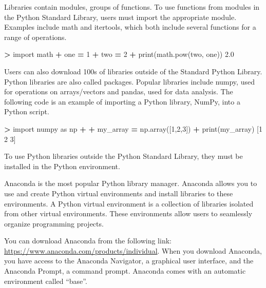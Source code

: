 \documentclass[
]{book}
\newenvironment{Shaded}{\begin{snugshade}}{\end{snugshade}}
\newcommand{\BuiltInTok}[1]{#1}
\newcommand{\DecValTok}[1]{\textcolor[rgb]{0.00,0.00,0.81}{#1}}
\newcommand{\FloatTok}[1]{\textcolor[rgb]{0.00,0.00,0.81}{#1}}
\newcommand{\ImportTok}[1]{#1}
\newcommand{\NormalTok}[1]{#1}
\newcommand{\OperatorTok}[1]{\textcolor[rgb]{0.81,0.36,0.00}{\textbf{#1}}}
\begin{document}
Libraries contain modules, groups of functions. To use functions from modules in the Python Standard Library, users must import the appropriate module. Examples include math and itertools, which both include several functions for a range of operations.

\begin{Shaded}
\begin{Highlighting}[]
\OperatorTok{\textgreater{}} \ImportTok{import}\NormalTok{ math}
\OperatorTok{+}\NormalTok{ one }\OperatorTok{=} \DecValTok{1}
\OperatorTok{+}\NormalTok{ two }\OperatorTok{=} \DecValTok{2}
\OperatorTok{+} \BuiltInTok{print}\NormalTok{(math.}\BuiltInTok{pow}\NormalTok{(two, one))}
\FloatTok{2.0}
\end{Highlighting}
\end{Shaded}

Users can also download 100s of libraries outside of the Standard Python Library. Python libraries are also called packages. Popular libraries include numpy, used for operations on arrays/vectors and pandas, used for data analysis. The following code is an example of importing a Python library, NumPy, into a Python script.

\begin{Shaded}
\begin{Highlighting}[]
\OperatorTok{\textgreater{}} \ImportTok{import}\NormalTok{ numpy }\ImportTok{as}\NormalTok{ np}
\OperatorTok{+} 
\OperatorTok{+}\NormalTok{ my\_array }\OperatorTok{=}\NormalTok{ np.array([}\DecValTok{1}\NormalTok{,}\DecValTok{2}\NormalTok{,}\DecValTok{3}\NormalTok{])}
\OperatorTok{+} \BuiltInTok{print}\NormalTok{(my\_array)}
\NormalTok{[}\DecValTok{1} \DecValTok{2} \DecValTok{3}\NormalTok{]}
\end{Highlighting}
\end{Shaded}

To use Python libraries outside the Python Standard Library, they must be installed in the Python environment.

Anaconda is the most popular Python library manager. Anaconda allows you to use and create Python virtual environments and install libraries to these environments. A Python virtual environment is a collection of libraries isolated from other virtual environments. These environments allow users to seamlessly organize programming projects.

You can download Anaconda from the following link: \url{https://www.anaconda.com/products/individual}. When you download Anaconda, you have access to the Anaconda Navigator, a graphical user interface, and the Anaconda Prompt, a command prompt. Anaconda comes with an automatic environment called ``base''.
\end{document}
